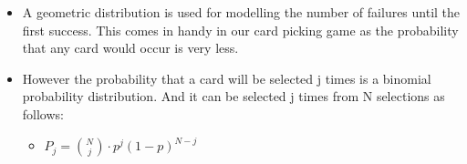 \documentclass[11pt]{article}
\providecommand{\tightlist}{%
      \setlength{\itemsep}{0pt}\setlength{\parskip}{0pt}}
\begin{document}
    \begin{itemize}
\item
  A geometric distribution is used for modelling the number of failures
  until the first success. This comes in handy in our card picking game
  as the probability that any card would occur is very less.
\item
  However the probability that a card will be selected j times is a
  binomial probability distribution. And it can be selected j times from
  N selections as follows:

  \begin{itemize}
  \tightlist
  \item
    \(P_j = \binom{N}{j} \cdot p^j(1-p)^{N-j}\)
  \end{itemize}
\end{itemize}
\end{document}
